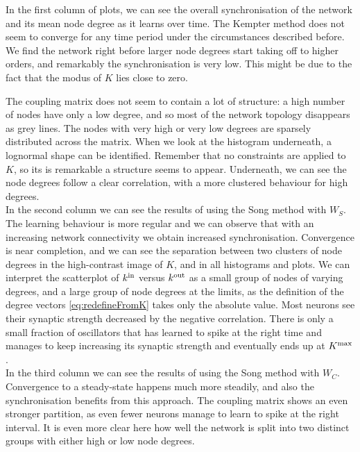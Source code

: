 In the first column of plots, we can see the overall synchronisation of the network and its mean node degree as it learns over time. The Kempter method does not seem to converge for any time period under the circumstances described before. We find the network right before larger node degrees start taking off to higher orders, and remarkably the synchronisation is very low. This might be due to the fact that the modus of $K$ lies close to zero.

The coupling matrix does not seem to contain a lot of structure: a high number of nodes have only a low degree, and so most of the network topology disappears as grey lines. The nodes with very high or very low degrees are sparsely distributed across the matrix. When we look at the histogram underneath, a lognormal shape can be identified. Remember that no constraints are applied to $K$, so its is remarkable a structure seems to appear. Underneath, we can see the node degrees follow a clear correlation, with a more clustered behaviour for high degrees. \\

In the second column we can see the results of using the Song method with $W_S$. The learning behaviour is more regular and we can observe that with an increasing network connectivity we obtain increased synchronisation. Convergence is near completion, and we can see the separation between two clusters of node degrees in the high-contrast image of $K$, and in all histograms and plots. We can interpret the scatterplot of ${k^{\rm in}}$ versus ${k^{\rm out}}$ as a small group of nodes of varying degrees, and a large group of node degrees at the limits, as the definition of the degree vectors \eqref{eq:redefineFromK} takes only the absolute value. Most neurons see their synaptic strength decreased by the negative correlation. There is only a small fraction of oscillators that has learned to spike at the right time and manages to keep increasing its synaptic strength and eventually ends up at $K^{\rm max}$. \\%

In the third column we can see the results of using the Song method with $W_C$. Convergence to a steady-state happens much more steadily, and also the synchronisation benefits from this approach. The coupling matrix shows an even stronger partition, as even fewer neurons manage to learn to spike at the right interval. It is even more clear here how well the network is split into two distinct groups with either high or low node degrees.\\

